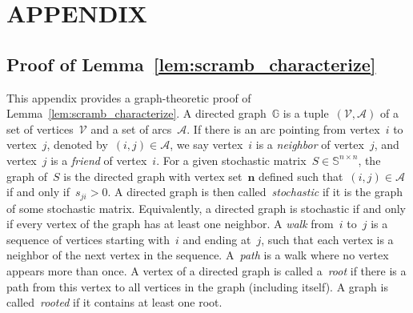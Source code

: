 \documentclass[letterpaper, 10 pt, conference]{ieeeconf}  %
\newcommand{\stoc}{\mathbb{S}} %
\begin{document}







\section*{APPENDIX}
\subsection{Proof of Lemma~\ref{lem:scramb_characterize}}

This appendix provides a graph-theoretic proof of Lemma~\ref{lem:scramb_characterize}. A directed graph~$\mathbb{G}$ is a tuple~$(\mathcal{V},\mathcal{A})$ of a set of vertices~$\mathcal{V}$ and a set of arcs~$\mathcal{A}$. If there is an arc pointing from vertex~$i$ to vertex~$j$, denoted by~$(i,j) \in \mathcal{A}$, we say vertex~$i$ is a \emph{neighbor} of vertex~$j$, and vertex~$j$ is a \emph{friend} of vertex~$i$. For a given stochastic matrix~$S \in \stoc^{n \times n}$, the graph of~$S$ is the directed graph with vertex set~$\mathbf{n}$ defined such that~$(i,j) \in \mathcal{A}$ if and only if~$s_{ji} > 0$. A directed graph is then called~\emph{stochastic} if it is the graph of some stochastic matrix. Equivalently, a directed graph is stochastic if and only if every vertex of the graph has at least one neighbor. A \emph{walk} from~$i$ to~$j$ is a sequence of vertices starting with~$i$ and ending at~$j$, such that each vertex is a neighbor of the next vertex in the sequence. A~\emph{path} is a walk where no vertex appears more than once. A vertex of a directed graph is called a~\emph{root} if there is a path from this vertex to all vertices in the graph (including itself). A graph is called~\emph{rooted} if it contains at least one root.
\end{document}
